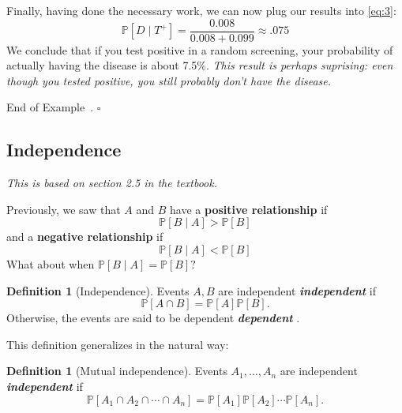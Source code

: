 \documentclass[10pt]{article}
\theoremstyle{definition}
\newtheorem{definition}[theorem]{Definition}
\newtheorem{example}[theorem]{Example}
\renewenvironment{example}
{\begin{oldexample}}
  {\par\smallskip\hfill   End of Example~\theexample. $\square$    \par\end{oldexample}}
\newcommand{\1}[1]{\textbf{1}_{\left[#1\right]}} %
\def\P{\mathbb{P}} %
\DeclareRobustCommand{\demph}[1]{%
  \ifmmode
  {\color{Blue}#1}%
  \else
  {\color{Blue}\bfseries\slshape #1}%
  \fi
}
\begin{document}
\begin{example}[Diagnostic tests]
  Finally, having done the necessary work, we can now plug our results into \cref{eq:3}:
  \begin{equation*}
    \P\left[D\mid T^{+} \right] = \frac{0.008}{0.008 + 0.099} \approx .075
  \end{equation*}
  We conclude that if you test positive in a random screening, your
  probability of actually having the disease is about 7.5\%. \textit{This
    result is perhaps suprising: even though you tested positive, you still
    probably don't have the disease.}
\end{example}

\subsection{Independence}
\textit{This is based on section 2.5 in the textbook.}

Previously, we saw that $A$ and $B$ have a \textbf{positive relationship} if
\begin{equation*}
  \P\left[B\mid A \right]> \P\left[B \right]
\end{equation*}
and a \textbf{negative relationship} if
\begin{equation*}
  \P\left[B\mid A \right]< \P\left[B \right]
\end{equation*}
What about when $\P\left[B\mid A \right] = \P\left[B \right]?$

\begin{definition}[Independence]
  \label{def:independence}
  Events $A,B$ are \demph{independent} if
  \begin{equation*}
    \P\left[A\cap B \right] = \P\left[A \right] \P\left[B \right].
  \end{equation*}
  Otherwise, the events
  are said to be \demph{dependent}.
\end{definition}

This definition generalizes in the natural way:

\begin{definition}[Mutual independence]
  \label{def:mutual-independence}
  Events $A_{1},\ldots,A_{n}$ are \demph{independent} if
  \begin{equation*} 
    \P\left[A_{1}\cap A_{2}\cap\cdots \cap A_{n} \right] = \P\left[A_{1} \right] \P\left[A_{2} \right]\cdots \P\left[A_{n} \right].
  \end{equation*}
\end{definition}
\end{document}
